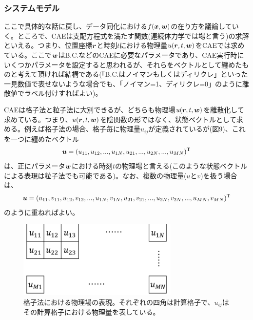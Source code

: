 \documentclass[dvipdfmx, 9pt, a4paper]{jsarticle}
\newcommand{\bm}[1]{{\mbox{\boldmath $#1$}}}
\begin{document}
\subsubsection{システムモデル}
ここで具体的な話に戻し、データ同化における$f(\bm x, \bm w)$の在り方を議論していく。ところで、CAEは支配方程式を満たす関数(連続体力学では場と言う)の求解といえる。つまり、位置座標$\bm r$と時刻$t$における物理量$u(\bm r, t, \bm w)$をCAEでは求めている。ここで$\bm w$はB.C.などのCAEに必要なパラメータであり、CAE実行時にいくつかパラメータを設定すると思われるが、それらをベクトルとして纏めたものと考えて頂ければ結構である(「B.C.はノイマンもしくはディリクレ」といった一見数値で表せないような場合でも、「ノイマン=1、ディリクレ=0」のように離散値でラベル付けすればよい)。\par
CAEは格子法と粒子法に大別できるが、どちらも物理場$u(\bm r, t, \bm w)$を離散化して求めている。つまり、$u(\bm r, t, \bm w)$を陰関数の形ではなく、状態ベクトルとして求める。例えば格子法の場合、格子毎に物理量$u_{ij}$が定義されているが(図9)、これを一つに纏めたベクトル
\begin{equation}
{\bm u}=(u_{11}, u_{12}, ..., u_{1N}, u_{21}, ..., u_{2N}, ..., u_{MN})^{\rm T} \notag
\end{equation}
は、正にパラメータ$\bm w$における時刻$t$の物理場と言える(このような状態ベクトルによる表現は粒子法でも可能である)。なお、複数の物理量($u$と$v$)を扱う場合は、
\begin{equation}
{\bm u}=(u_{11}, v_{11}, u_{12}, v_{12}, ..., u_{1N}, v_{1N}, u_{21}, v_{21}, ..., u_{2N}, v_{2N}, ..., u_{MN}, v_{MN})^{\rm T} \notag
\end{equation}
のように重ねればよい。

\begin{figure}[t]
\begin{center}
\includegraphics[width=8cm]{"fig9.png"}
\caption{格子法における物理場の表現。それぞれの四角は計算格子で、$u_{ij}$はその計算格子における物理量を表している。}
\end{center}
\end{figure}
\end{document}
